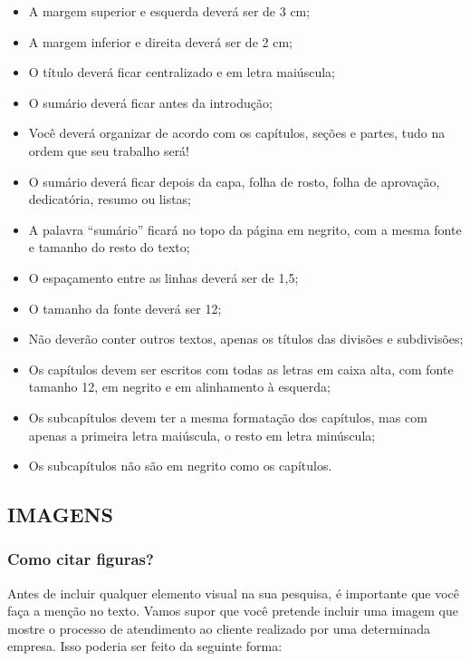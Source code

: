 \begin{itemize}
    \item A margem superior e esquerda deverá ser de 3 cm;
    \item A margem inferior e direita deverá ser de 2 cm;
    \item O título deverá ficar centralizado e em letra maiúscula;
    \item O sumário deverá ficar antes da introdução;
    \item Você deverá organizar de acordo com os capítulos, seções e partes, tudo na ordem que seu trabalho será!
    \item O sumário deverá ficar depois da capa, folha de rosto, folha de aprovação, dedicatória, resumo ou listas;
    \item A palavra “sumário” ficará no topo da página em negrito, com a mesma fonte e tamanho do resto do texto;
    \item O espaçamento entre as linhas deverá ser de 1,5;
    \item O tamanho da fonte deverá ser 12;
    \item Não deverão conter outros textos, apenas os títulos das divisões e subdivisões;
    \item Os capítulos devem ser escritos com todas as letras em caixa alta, com fonte tamanho 12, em negrito e em alinhamento à esquerda;
    \item Os subcapítulos devem ter a mesma formatação dos capítulos, mas com apenas a primeira letra maiúscula, o resto em letra minúscula;
    \item Os subcapítulos não são em negrito como os capítulos.
\end{itemize}

\newpage

\subsection{IMAGENS}

\subsubsection{Como citar figuras?}

Antes de incluir qualquer elemento visual na sua pesquisa, é importante que você faça a menção no texto. Vamos supor que você pretende incluir uma imagem que mostre o processo de atendimento ao cliente realizado por uma determinada empresa. Isso poderia ser feito da seguinte forma:

